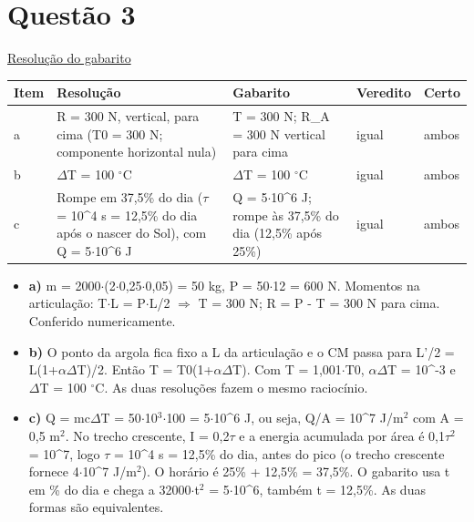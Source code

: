 \documentclass{article}%
\begin{document}
\section*{Questão 3}%
\href{https://poliedroresolve.sistemapoliedro.com.br/vestibulares/ime/2027/ime-2-fase-dia-2-27-10-2026-2-fase-dia-2/dissertativa-3-fisica-2-fase-dia-2-ime-2027}{Resolução do gabarito}\par\smallskip%
\begin{longtable}{@{}p{} p{} p{} p{} p{}@{}}\toprule Item & Resolução & Gabarito & Veredito & Certo \\ \midrule
a & R = 300 N, vertical, para cima (T0 = 300 N; componente horizontal nula) & T = 300 N; R\_A = 300 N vertical para cima & igual & ambos \\
b & $\Delta$T = 100 $^\circ$C & $\Delta$T = 100 $^\circ$C & igual & ambos \\
c & Rompe em 37,5\% do dia ($\tau$ = 10\^{}4 s = 12,5\% do dia após o nascer do Sol), com Q = 5$\cdot$10\^{}6 J & Q = 5$\cdot$10\^{}6 J; rompe às 37,5\% do dia (12,5\% após 25\%) & igual & ambos \\
\bottomrule\end{longtable}%
\begin{itemize}%
\item%
\textbf{a)} m = 2000$\cdot$(2$\cdot$0,25$\cdot$0,05) = 50 kg, P = 50$\cdot$12 = 600 N. Momentos na articulação: T$\cdot$L = P$\cdot$L/2 $\Rightarrow$ T = 300 N; R = P - T = 300 N para cima. Conferido numericamente.%
\item%
\textbf{b)} O ponto da argola fica fixo a L da articulação e o CM passa para L'/2 = L(1+$\alpha$$\Delta$T)/2. Então T = T0(1+$\alpha$$\Delta$T). Com T = 1,001$\cdot$T0, $\alpha$$\Delta$T = 10\^{}{-}3 e $\Delta$T = 100 $^\circ$C. As duas resoluções fazem o mesmo raciocínio.%
\item%
\textbf{c)} Q = mc$\Delta$T = 50$\cdot$10$^3$$\cdot$100 = 5$\cdot$10\^{}6 J, ou seja, Q/A = 10\^{}7 J/m$^2$ com A = 0,5 m$^2$. No trecho crescente, I = 0,2$\tau$ e a energia acumulada por área é 0,1$\tau$$^2$ = 10\^{}7, logo $\tau$ = 10\^{}4 s = 12,5\% do dia, antes do pico (o trecho crescente fornece 4$\cdot$10\^{}7 J/m$^2$). O horário é 25\% + 12,5\% = 37,5\%. O gabarito usa t em \% do dia e chega a 32000$\cdot$t$^2$ = 5$\cdot$10\^{}6, também t = 12,5\%. As duas formas são equivalentes.%
\end{itemize}%
\end{document}
